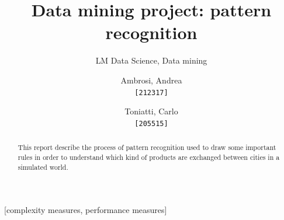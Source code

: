 \documentclass{acm_proc_article-sp-sigmod09}
\begin{document}
	
	
	
	\title{Data mining project: pattern recognition}
	\subtitle{LM Data Science, Data mining}
	
	\author{
		Ambrosi, Andrea\\
		\texttt{[212317]}
		\and
		Toniatti, Carlo\\
		\texttt{[205515]}
	}
	
	\maketitle
	\begin{abstract}
		This report describe the process of pattern recognition used to draw some important rules in order to understand which kind of products are exchanged between cities in a simulated world.
	\end{abstract}
	
	[complexity measures, performance measures]
	
	
	
\end{document}
